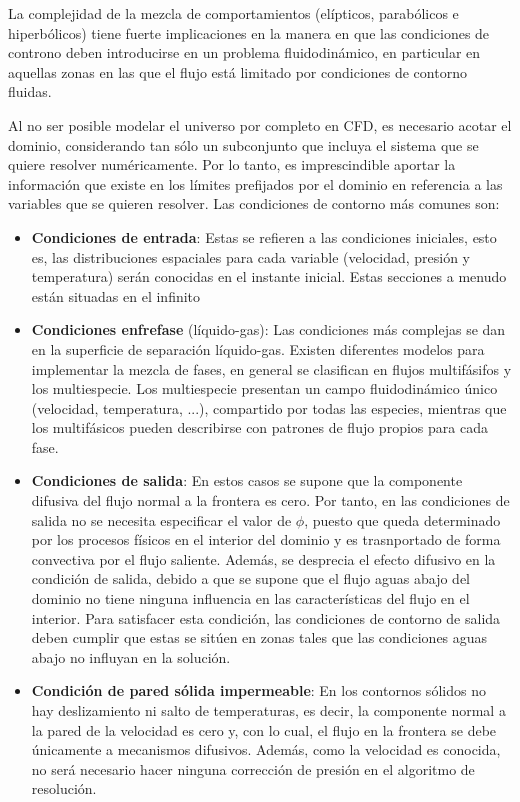 La complejidad de la mezcla de comportamientos (elípticos, parabólicos e
hiperbólicos) tiene fuerte implicaciones en la manera en que las
condiciones de controno deben introducirse en un problema
fluidodinámico, en particular en aquellas zonas en las que el flujo está
limitado por condiciones de contorno fluidas.

Al no ser posible modelar el universo por completo en CFD, es necesario
acotar el dominio, considerando tan sólo un subconjunto que incluya el
sistema que se quiere resolver numéricamente. Por lo tanto, es
imprescindible aportar la información que existe en los límites
prefijados por el dominio en referencia a las variables que se quieren
resolver. Las condiciones de contorno más comunes son:

\begin{itemize}
\item
  \textbf{Condiciones de entrada}: Estas se refieren a las condiciones
  iniciales, esto es, las distribuciones espaciales para cada variable
  (velocidad, presión y temperatura) serán conocidas en el instante
  inicial. Estas secciones a menudo están situadas en el infinito
\item
  \textbf{Condiciones enfrefase} (líquido-gas): Las condiciones más
  complejas se dan en la superficie de separación líquido-gas. Existen
  diferentes modelos para implementar la mezcla de fases, en general se
  clasifican en flujos multifásifos y los multiespecie. Los multiespecie
  presentan un campo fluidodinámico único (velocidad, temperatura, ...),
  compartido por todas las especies, mientras que los multifásicos
  pueden describirse con patrones de flujo propios para cada fase.
\item
  \textbf{Condiciones de salida}: En estos casos se supone que la
  componente difusiva del flujo normal a la frontera es cero. Por tanto,
  en las condiciones de salida no se necesita especificar el valor de
  \(\phi\), puesto que queda determinado por los procesos físicos en el
  interior del dominio y es trasnportado de forma convectiva por el
  flujo saliente. Además, se desprecia el efecto difusivo en la
  condición de salida, debido a que se supone que el flujo aguas abajo
  del dominio no tiene ninguna influencia en las características del
  flujo en el interior. Para satisfacer esta condición, las condiciones
  de contorno de salida deben cumplir que estas se sitúen en zonas tales
  que las condiciones aguas abajo no influyan en la solución.
\item
  \textbf{Condición de pared sólida impermeable}: En los contornos
  sólidos no hay deslizamiento ni salto de temperaturas, es decir, la
  componente normal a la pared de la velocidad es cero y, con lo cual,
  el flujo en la frontera se debe únicamente a mecanismos difusivos.
  Además, como la velocidad es conocida, no será necesario hacer ninguna
  corrección de presión en el algoritmo de resolución.


\end{itemize}
